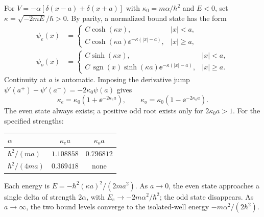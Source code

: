 For $V=-\alpha[\delta(x-a)+\delta(x+a)]$
with $\kappa_0=m\alpha/\hbar^2$ and $E<0$,
set $\kappa=\sqrt{-2mE}/\hbar>0$. By parity, a
normalized bound state has the form
\begin{align}
\psi_e(x)&=\begin{cases}
C\cosh(\kappa x),&|x|<a,\\
C\cosh(\kappa a)\ee^{-\kappa(|x|-a)},&|x|\ge a,
\end{cases}\\
\psi_o(x)&=\begin{cases}
C\sinh(\kappa x),&|x|<a,\\
C\,\operatorname{sgn}(x)\sinh(\kappa a)
\ee^{-\kappa(|x|-a)},&|x|\ge a.
\end{cases}
\end{align}
Continuity at $a$ is automatic. Imposing the derivative
jump $\psi'(a^+)-\psi'(a^-)=-2\kappa_0\psi(a)$ gives
\begin{equation}
\boxed{\kappa_e=\kappa_0(1+\ee^{-2\kappa_e a}),\qquad
\kappa_o=\kappa_0(1-\ee^{-2\kappa_o a})}.
\end{equation}
The even state always exists; a positive odd root exists
only for $2\kappa_0a>1$. For the specified strengths:
\begin{center}
\begin{tabular}{lcc}
\toprule
$\alpha$&$\kappa_e a$&$\kappa_o a$\\
\midrule
$\hbar^2/(ma)$&$1.108858$&$0.796812$\\
$\hbar^2/(4ma)$&$0.369418$&none\\
\bottomrule
\end{tabular}
\end{center}
Each energy is $E=-\hbar^2(\kappa a)^2/(2ma^2)$.
As $a\to0$, the even state approaches a single
delta of strength $2\alpha$, with
$E_e\to-2m\alpha^2/\hbar^2$; the odd state disappears.
As $a\to\infty$, the two bound levels converge
to the isolated-well energy $-m\alpha^2/(2\hbar^2)$.


